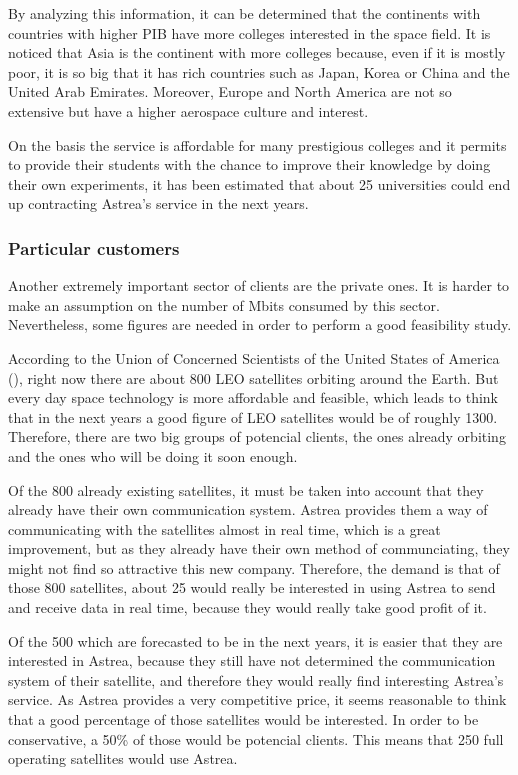 By analyzing this information, it can be determined that the continents with countries with higher PIB have more colleges interested in the space field. It is noticed that Asia is the continent with more colleges because, even if it is mostly poor, it is so big that it has rich countries such as Japan, Korea or China and the United Arab Emirates. Moreover, Europe and North America are not so extensive but have a higher aerospace culture and interest. 

On the basis the service is affordable for many prestigious colleges and it permits to provide their students with the chance to improve their knowledge by doing their own experiments, it has been estimated that about 25 universities could end up contracting Astrea's service in the next years.

\subsubsection{Particular customers}
Another extremely important sector of clients are the private ones. It is harder to make an assumption on the number of Mbits consumed by this sector. Nevertheless, some figures are needed in order to perform a good feasibility study. 

According to the Union of Concerned Scientists of the United States of America (\cite{UCSUSA}), right now there are about 800 LEO satellites orbiting around the Earth. But every day space technology is more affordable and feasible, which leads to think that in the next years a good figure of LEO satellites would be of roughly 1300. Therefore, there are two big groups of potencial clients, the ones already orbiting and the ones who will be doing it soon enough.

Of the 800 already existing satellites, it must be taken into account that they already have their own communication system. Astrea provides them a way of communicating with the satellites almost in real time, which is a great improvement, but as they already have their own method of communciating, they might not find so attractive this new company. Therefore, the demand is that of those 800 satellites, about 25 would really be interested in using Astrea to send and receive data in real time, because they would really take good profit of it.

Of the 500 which are forecasted to be in the next years, it is easier that they are interested in Astrea, because they still have not determined the communication system of their satellite, and therefore they would really find interesting Astrea's service. As Astrea provides a very competitive price, it seems reasonable to think that a good percentage of those satellites would be interested. In order to be conservative, a 50\% of those would be potencial clients. This means that 250 full operating satellites would use Astrea.

